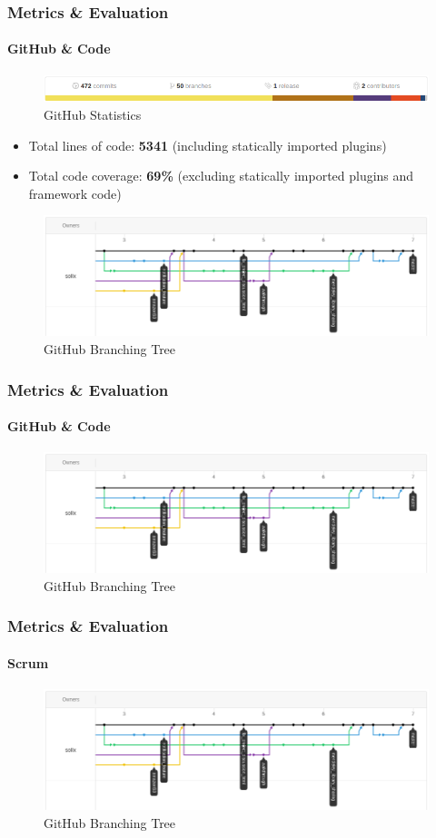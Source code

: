 \documentclass{beamer}
\begin{document}
\begin{frame}
\frametitle{Metrics \& Evaluation}
\framesubtitle{GitHub \& Code}
	\begin{figure}
		\includegraphics[scale=0.3]{./images/github_stats.png}
		\caption{GitHub Statistics}
	\end{figure}
	\begin{itemize}
		\item Total lines of code: \textbf{5341} (including statically imported plugins)
		\item Total code coverage: \textbf{69\%} (excluding statically imported plugins and framework code)
	\end{itemize}
	\begin{figure}
		\includegraphics[scale=0.2]{./images/github_tree.png}
		\caption{GitHub Branching Tree}
	\end{figure}
\end{frame}

\begin{frame}
\frametitle{Metrics \& Evaluation}
\framesubtitle{GitHub \& Code}
	\begin{figure}
		\includegraphics[scale=0.3]{./images/github_tree.png}
		\caption{GitHub Branching Tree}
	\end{figure}
\end{frame}

\begin{frame}
\frametitle{Metrics \& Evaluation}
\framesubtitle{Scrum}
	\begin{figure}
		\includegraphics[scale=0.3]{./images/github_tree.png}
		\caption{GitHub Branching Tree}
	\end{figure}
\end{frame}
\end{document}
